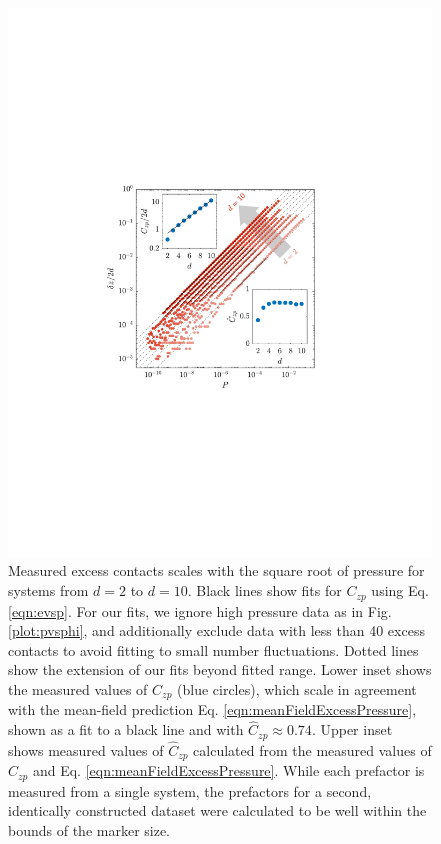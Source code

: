 %
%
\begin{figure}[h!]
\includegraphics[width=\columnwidth, trim=143 244 169 235, clip]{excessContactsScaling/evspSub.pdf}
\caption{  Measured excess contacts scales with the square root of pressure for systems from $d=2$ to $d=10$. Black lines show fits for $C_{zp}$ using Eq. \ref{eqn:evsp}. For our fits, we ignore high pressure data as in Fig. \ref{plot:pvsphi}, and additionally exclude data with less than 40 excess contacts to avoid fitting to small number fluctuations. Dotted lines show the extension of our fits beyond fitted range. Lower inset shows the measured values of $C_{zp}$ (blue circles), which scale in agreement with the mean-field prediction Eq. \ref{eqn:meanFieldExcessPressure}, shown as a fit to a black line and with $\hat{C}_{zp} \approx 0.74$.  Upper inset shows measured values of $\hat{C}_{zp}$ calculated from the measured values of $C_{zp}$ and Eq. \ref{eqn:meanFieldExcessPressure}. While each prefactor is measured from a single system, the prefactors for a second, identically constructed dataset were calculated to be well within the bounds of the marker size.}
\label{plot:evsp}
\end{figure}
%
